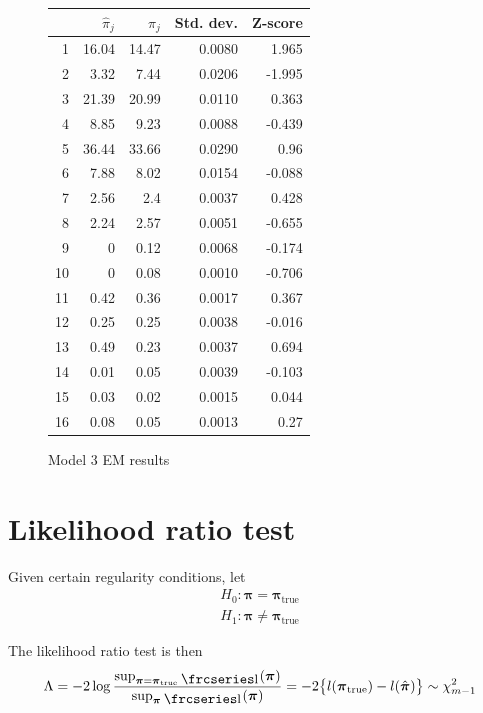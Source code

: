 \documentclass[12pt]{amsart}
\newcommand{\textfrc}[1]{{\frcseries#1}}
\newcommand{\mathfrc}[1]{\raisebox{-0.8mm}{\text{\textfrc{\small #1}}}\hspace{0.4mm}}
\newcommand{\vect}[1]{\boldsymbol{\mathbf{#1}}}
\newcommand{\eqn}[1]{\begin{align*}
#1
\end{align*}}
\newcommand{\bl}{\big\{}
\newcommand{\br}{\big\}}
\newcommand{\vp}{\vect{\pi}}
\newcommand{\vph}{\hat{\vect{\pi}}}
\newcommand{\llp}{\mathfrc{l}(\vect{\pi})}
\begin{document}
\begin{figure}

\begin{tabular}{r| r| r| r| r|}
		& $\hat{\pi}_j$ & $\pi_j$ & Std. dev. & Z-score	\\
		\hline
1	& 16.04   &     14.47   &         0.0080    &    1.965      \\
2	&  3.32   &      7.44   &         0.0206   &   -1.995      \\
3	& 21.39   &     20.99   &         0.0110   &    0.363      \\
4	&  8.85   &      9.23   &         0.0088    &   -0.439      \\
5	& 36.44   &     33.66   &         0.0290   &     0.96      \\
6	&  7.88   &      8.02   &         0.0154   &   -0.088      \\
7	&  2.56   &       2.4   &         0.0037    &    0.428      \\
8	&  2.24   &      2.57   &         0.0051    &   -0.655      \\
9	&     0   &      0.12   &         0.0068    &   -0.174      \\
10	&     0   &      0.08   &         0.0010    &   -0.706      \\
11	&  0.42   &      0.36   &         0.0017   &    0.367      \\
12	&  0.25   &      0.25   &         0.0038    &   -0.016      \\
13	&  0.49   &      0.23   &         0.0037    &    0.694      \\
14	&  0.01   &      0.05   &         0.0039    &   -0.103      \\
15	&  0.03   &      0.02   &         0.0015    &    0.044      \\
16	&  0.08   &      0.05   &         0.0013    &     0.27      \\   		\end{tabular}
\caption{Model 3 EM results}
\end{figure}
               

\clearpage
\section{Likelihood ratio test}
Given certain regularity conditions, let
\eqn{
	H_0: \vp = \vp_\text{true}	\\
	H_1: \vp \neq \vp_\text{true}
}

The likelihood ratio test is then
\eqn{
	\Lambda = -2 \log \frac{ \sup_{\vp=\vp_\text{true}} \llp}{ \sup_{\vp} \llp }  = -2\bl l(\vp_\text{true}) - l(\vph) \br \sim \chi^2_{m-1}	\\
}
\end{document}

